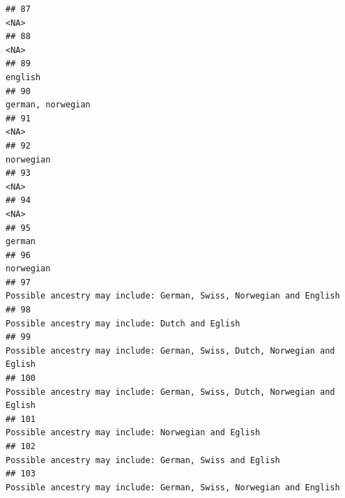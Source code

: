 \documentclass[]{article}
\begin{document}
\begin{verbatim}
## 87                                                                                                                                                 <NA>
## 88                                                                                                                                                 <NA>
## 89                                                                                                                                              english
## 90                                                                                                                                    german, norwegian
## 91                                                                                                                                                 <NA>
## 92                                                                                                                                            norwegian
## 93                                                                                                                                                 <NA>
## 94                                                                                                                                                 <NA>
## 95                                                                                                                                               german
## 96                                                                                                                                            norwegian
## 97                                                                                  Possible ancestry may include: German, Swiss, Norwegian and English
## 98                                                                                                      Possible ancestry may include: Dutch and Eglish
## 99                                                                            Possible ancestry may include: German, Swiss, Dutch, Norwegian and Eglish
## 100                                                                           Possible ancestry may include: German, Swiss, Dutch, Norwegian and Eglish
## 101                                                                                                 Possible ancestry may include: Norwegian and Eglish
## 102                                                                                             Possible ancestry may include: German, Swiss and Eglish
## 103                                                                                 Possible ancestry may include: German, Swiss, Norwegian and English

\end{verbatim}
\end{document}
